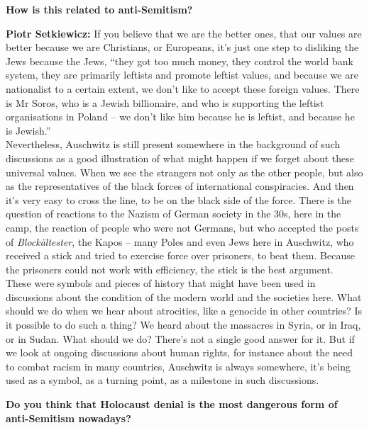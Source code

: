 \textbf{How is this related to anti-Semitism?} 

\textbf{Piotr Setkiewicz:} If you believe that we are the better ones, that our values are better because we are Christians, or Europeans, it’s just one step to disliking the Jews because the Jews, ``they got too much money, they control the world bank system, they are primarily leftists and promote leftist values, and because we are nationalist to a certain extent, we don’t like to accept these foreign values. There is Mr Soros, who is a Jewish billionaire, and who is supporting the leftist organisations in Poland – we don’t like him because he is leftist, and because he is Jewish.''\\
Nevertheless, Auschwitz is still present somewhere in the background of such discussions as a good illustration of what might happen if we forget about these universal values. When we see the strangers not only as the other people, but also as the representatives of the black forces of international conspiracies. And then it’s very easy to cross the line, to be on the black side of the force. There is the question of reactions to the Nazism of German society in the 30s, here in the camp, the reaction of people who were not Germans, but who accepted the posts of \textit{Blockältester}, the Kapos – many Poles and even Jews here in Auschwitz, who received a stick and tried to exercise force over prisoners, to beat them. Because the prisoners could not work with efficiency, the stick is the best argument.\\ 
These were symbols and pieces of history that might have been used in  discussions about the condition of the modern world and the societies here. What should we do when we hear about atrocities, like a genocide in other countries? Is it possible to do such a thing? We heard about the massacres in Syria, or in Iraq, or in Sudan. What should we do? There’s not a single good answer for it. But if we look at ongoing discussions about human rights, for instance about the need to combat racism in many countries, Auschwitz is always somewhere, it's being used as a symbol, as a turning point, as a milestone in such discussions.
 
\textbf{Do you think that Holocaust denial is the most dangerous form of anti-Semitism nowadays?}

